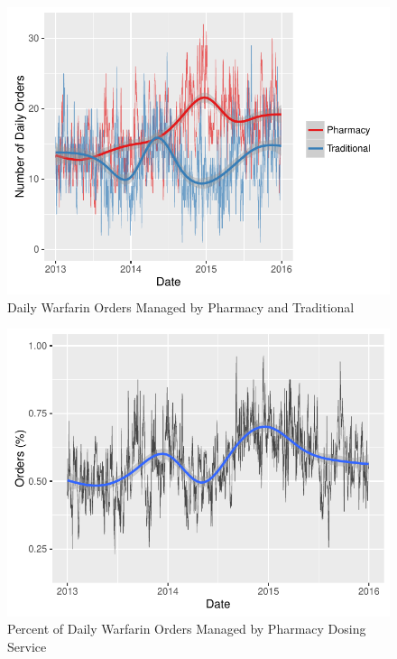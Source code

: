 \documentclass[]{article}
\begin{document}
\begin{figure}[H]
\centering
\includegraphics{warfarin_analysis_ASHP_files/figure-latex/dose_service_use-1.pdf}
\caption{Daily Warfarin Orders Managed by Pharmacy and Traditional}
\end{figure}

\begin{figure}[H]
\centering
\includegraphics{warfarin_analysis_ASHP_files/figure-latex/dose_service_use2-1.pdf}
\caption{Percent of Daily Warfarin Orders Managed by Pharmacy Dosing
Service}
\end{figure}
\end{document}
